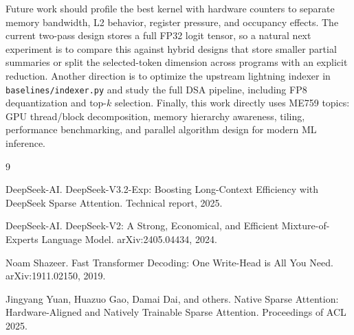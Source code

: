 \documentclass{article}
\begin{document}
Future work should profile the best kernel with hardware counters to separate memory
bandwidth, L2 behavior, register pressure, and occupancy effects. The current two-pass
design stores a full FP32 logit tensor, so a natural next experiment is to compare this
against hybrid designs that store smaller partial summaries or split the selected-token
dimension across programs with an explicit reduction. Another direction is to optimize
the upstream lightning indexer in \texttt{baselines/indexer.py} and study the full DSA
pipeline, including FP8 dequantization and top-$k$ selection.
Finally, this work directly uses ME759 topics: GPU thread/block decomposition, memory
hierarchy awareness, tiling, performance benchmarking, and parallel algorithm design for
modern ML inference.



\begin{thebibliography}{9}

DeepSeek-AI.
\newblock DeepSeek-V3.2-Exp: Boosting Long-Context Efficiency with DeepSeek Sparse Attention.
\newblock Technical report, 2025.

DeepSeek-AI.
\newblock DeepSeek-V2: A Strong, Economical, and Efficient Mixture-of-Experts Language Model.
\newblock arXiv:2405.04434, 2024.

Noam Shazeer.
\newblock Fast Transformer Decoding: One Write-Head is All You Need.
\newblock arXiv:1911.02150, 2019.

Jingyang Yuan, Huazuo Gao, Damai Dai, and others.
\newblock Native Sparse Attention: Hardware-Aligned and Natively Trainable Sparse Attention.
\newblock Proceedings of ACL 2025.

\end{thebibliography}
\end{document}

